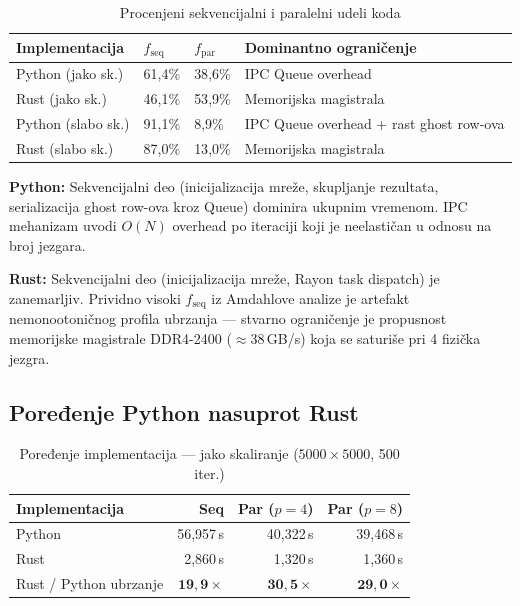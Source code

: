 \documentclass[12pt,a4paper]{article}
\begin{document}
\begin{table}[H]
    \centering
    \caption{Procenjeni sekvencijalni i paralelni udeli koda}
    \begin{tabular}{llll}
        \toprule
        \textbf{Implementacija} & $f_{\mathrm{seq}}$ & $f_{\mathrm{par}}$ & \textbf{Dominantno ograničenje} \\
        \midrule
        Python (jako sk.) & 61{,}4\% & 38{,}6\% & IPC Queue overhead \\
        Rust (jako sk.)   & 46{,}1\% & 53{,}9\% & Memorijska magistrala \\
        Python (slabo sk.)& 91{,}1\% &  8{,}9\% & IPC Queue overhead + rast ghost row-ova \\
        Rust (slabo sk.)  & 87{,}0\% & 13{,}0\% & Memorijska magistrala \\
        \bottomrule
    \end{tabular}
\end{table}

\textbf{Python:} Sekvencijalni deo (inicijalizacija mreže, skupljanje rezultata, serializacija
ghost row-ova kroz Queue) dominira ukupnim vremenom. IPC mehanizam uvodi $O(N)$ overhead
po iteraciji koji je neelastičan u odnosu na broj jezgara.

\textbf{Rust:} Sekvencijalni deo (inicijalizacija mreže, Rayon task dispatch) je zanemarljiv.
Prividno visoki $f_{\mathrm{seq}}$ iz Amdahlove analize je artefakt nemonootoničnog profila
ubrzanja --- stvarno ograničenje je propusnost memorijske magistrale DDR4-2400 ($\approx$38\,GB/s)
koja se saturiše pri 4 fizička jezgra.

\subsection{Poređenje Python nasuprot Rust}

\begin{table}[H]
    \centering
    \caption{Poređenje implementacija --- jako skaliranje ($5000\times5000$, 500 iter.)}
    \begin{tabular}{lrrr}
        \toprule
        \textbf{Implementacija} & \textbf{Seq} & \textbf{Par ($p=4$)} & \textbf{Par ($p=8$)} \\
        \midrule
        Python & 56{,}957\,s & 40{,}322\,s & 39{,}468\,s \\
        Rust   & 2{,}860\,s  & 1{,}320\,s  & 1{,}360\,s  \\
        \midrule
        Rust / Python ubrzanje & $\mathbf{19{,}9\times}$ & $\mathbf{30{,}5\times}$ & $\mathbf{29{,}0\times}$ \\
        \bottomrule
    \end{tabular}
\end{table}
\end{document}
